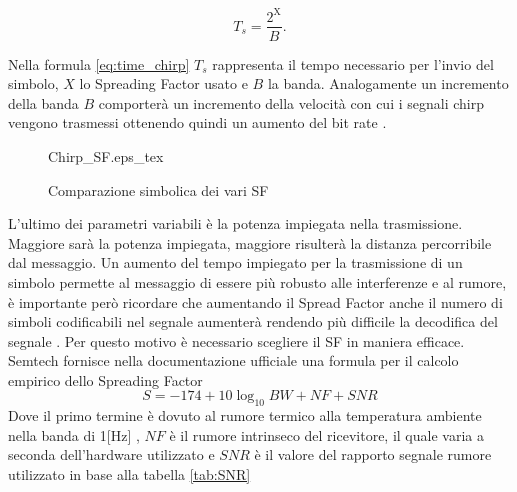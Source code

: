 \begin{equation}\label{eq:time_chirp}
        T_s=\frac{2^{\text{X}}}{B}.
\end{equation}

Nella formula \ref{eq:time_chirp} $T_s$ rappresenta il tempo necessario per
l'invio del simbolo, $X$ lo Spreading Factor usato e $B$ la banda.
Analogamente un incremento della banda $B$ comporterà un
incremento della velocità con cui i segnali chirp vengono trasmessi ottenendo
quindi un aumento del bit rate .

\begin{figure}[h]
        \centering 
        {Chirp_SF.eps_tex}
                \caption{Comparazione simbolica dei vari SF}
        \label{fig:sf_var}
\end{figure}

L'ultimo dei parametri variabili è la potenza impiegata nella trasmissione.
Maggiore sarà la potenza impiegata, maggiore risulterà la distanza percorribile
dal messaggio.
Un aumento del tempo impiegato per la trasmissione di un simbolo permette al
messaggio di essere più robusto alle interferenze e al rumore, è importante però
ricordare che aumentando il Spread Factor anche il numero di simboli codificabili nel
segnale  aumenterà rendendo più difficile la decodifica del segnale 
. Per questo motivo è necessario scegliere il SF in
maniera efficace. Semtech fornisce nella documentazione ufficiale una formula
per il calcolo empirico dello Spreading Factor  
\begin{equation}
        S = -174+10\log_{10}BW + NF + SNR
\end{equation}
Dove il primo termine è dovuto al rumore termico alla temperatura ambiente nella
banda di 1[Hz] , $NF$ è il rumore intrinseco del ricevitore, il
quale varia  a seconda  dell'hardware utilizzato e 
$SNR$ è il valore del rapporto segnale rumore utilizzato in base alla tabella \ref{tab:SNR}

